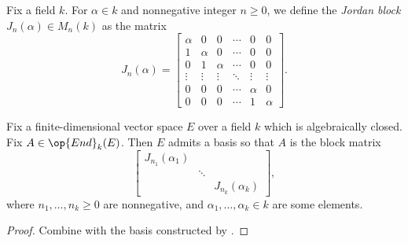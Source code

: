 \documentclass[../notes.tex]{subfiles}
\begin{document}
\begin{notation}
	Fix a field $k$. For $\alpha\in k$ and nonnegative integer $n\ge0$, we define the \textit{Jordan block} $J_n(\alpha)\in M_n(k)$ as the matrix
	\[J_n(\alpha)=\begin{bmatrix}
		\alpha & 0 & 0 & \cdots & 0 & 0 \\
		1 & \alpha & 0 & \cdots & 0 & 0 \\
		0 & 1 & \alpha & \cdots & 0 & 0 \\
		\vdots & \vdots & \vdots & \ddots & \vdots & \vdots \\
		0 & 0 & 0 & \cdots & \alpha & 0 \\
		0 & 0 & 0 & \cdots & 1 & \alpha
	\end{bmatrix}.\]
\end{notation}
\begin{corollary}
	Fix a finite-dimensional vector space $E$ over a field $k$ which is algebraically closed. Fix $A\in\op{End}_k(E)$. Then $E$ admits a basis so that $A$ is the block matrix
	\[\begin{bmatrix}
		J_{n_1}(\alpha_1) \\ & \ddots \\ && J_{n_k}(\alpha_k)
	\end{bmatrix},\]
	where $n_1,\ldots,n_k\ge0$ are nonnegative, and $\alpha_1,\ldots,\alpha_k\in k$ are some elements.
\end{corollary}
\begin{proof}
	Combine  with the basis constructed by .
\end{proof}
\end{document}
